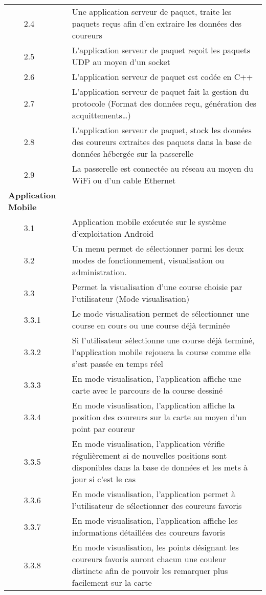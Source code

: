 \begin{longtable}{llp{10cm}}
 & 2.4 & Une application serveur de paquet, traite les paquets reçus afin d’en extraire les données des coureurs\\
 & 2.5 & L’application serveur de paquet reçoit les paquets UDP au moyen d’un socket  \\
 & 2.6 & L’application serveur de paquet est codée en C++ \\
 & 2.7 & L’application serveur de paquet fait la gestion du protocole (Format des données reçu, génération des acquittements…) \\
 & 2.8 & L’application serveur de paquet, stock les données des coureurs extraites des paquets dans la base de données hébergée sur la passerelle \\
 & 2.9 & La passerelle est connectée au réseau au moyen du WiFi ou d’un cable Ethernet \\
 \bottomrule
 \multicolumn{2}{l}{\textbf{Application Mobile}} \\
 & 3.1 & Application mobile exécutée sur le système d’exploitation Android \\
 & 3.2 & Un menu permet de sélectionner parmi les deux modes de fonctionnement, visualisation ou administration. \\
 & 3.3 & Permet la visualisation d’une course choisie par l’utilisateur (Mode visualisation) \\
 & 3.3.1 & Le mode visualisation permet de sélectionner une course en cours ou une course déjà terminée \\
 & 3.3.2 & Si l’utilisateur sélectionne une course déjà terminé, l’application mobile rejouera la course comme elle s’est passée en temps réel \\
 & 3.3.3 & En mode visualisation, l’application affiche une carte avec le parcours de la course dessiné \\
 & 3.3.4 & En mode visualisation, l’application affiche la position des coureurs sur la carte au moyen d’un point par coureur \\
 & 3.3.5 & En mode visualisation, l’application vérifie régulièrement si de nouvelles positions sont disponibles dans la base de données et les mets à jour si c’est le cas \\
 & 3.3.6 & En mode visualisation, l’application permet à l’utilisateur de sélectionner des coureurs favoris \\
 & 3.3.7 & En mode visualisation, l’application affiche les informations détaillées des coureurs favoris \\
 & 3.3.8 & En mode visualisation, les points désignant les coureurs favoris auront chacun une couleur distincte afin de pouvoir les remarquer plus facilement sur la carte \\

\end{longtable}
